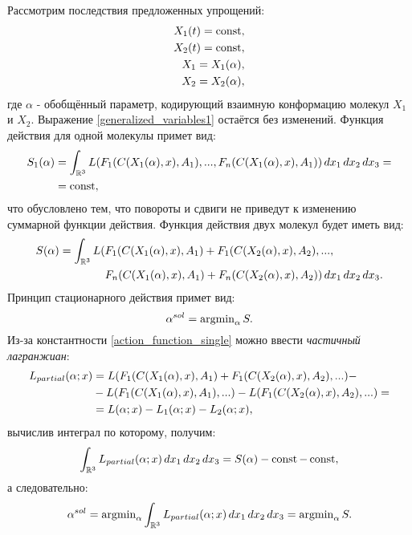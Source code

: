 Рассмотрим последствия предложенных упрощений:
\begin{align}
	X_1(t) = \operatorname{const}, \\
	X_2(t) = \operatorname{const}, \\
	X_1 = X_1(\alpha), \\
	X_2 = X_2(\alpha),
\end{align}
где $\alpha$ - обобщённый параметр, кодирующий взаимную конформацию молекул $X_1$ и $X_2$. Выражение \ref{generalized_variables1} остаётся без изменений.
Функция действия для одной молекулы примет вид:
\begin{align}
	S_1(\alpha) &= \int_{\mathbb{R}^3}L(F_1(C(X_1(\alpha), x), A_1), ...,F_n(C(X_1(\alpha), x), A_1)) \, dx_1 \, dx_2 \, dx_3 = \notag \\
				 &= \operatorname{const},
	\label{action_function_single}
\end{align}
что обусловлено тем, что повороты и сдвиги не приведут к изменению суммарной функции действия. Функция действия двух молекул будет иметь вид:
\begin{align}
	S(\alpha) = \int_{\mathbb{R}^3}L(&F_1(C(X_1(\alpha), x), A_1)+F_1(C(X_2(\alpha), x), A_2), ..., \notag \\
                                                     &F_n(C(X_1(\alpha), x), A_1) + F_n(C(X_2(\alpha), x), A_2)) \, dx_1 \, dx_2 \, dx_3.
	\label{action_function_two}
\end{align}
Принцип стационарного действия примет вид:
\begin{equation}
	\alpha^{sol} = \operatorname{argmin}_{\alpha}S.
	\label{lagrangian_principle_practical}
\end{equation}
Из-за константности \ref{action_function_single} можно ввести \textit{частичный лагранжиан}:
\begin{align}
	L_{partial}(\alpha; x) &= L(F_1(C(X_1(\alpha), x), A_1)+F_1(C(X_2(\alpha), x), A_2), ...) - \notag \\
						   &- L(F_1(C(X_1(\alpha), x), A_1), ...) - L(F_1(C(X_2(\alpha), x), A_2), ...) = \notag \\
						   &= L(\alpha; x) - L_1(\alpha; x) - L_2(\alpha; x),
	\label{partial_lagrangian}
\end{align}
вычислив интеграл по которому, получим:
\begin{equation}
	\int_{\mathbb{R}^3}L_{partial}(\alpha; x) \, dx_1 \, dx_2 \, dx_3 = S(\alpha) - \operatorname{const} - \operatorname{const},
\end{equation}
а следовательно:
\begin{equation}
	\alpha^{sol} = \operatorname{argmin}_{\alpha}\int_{\mathbb{R}^3}L_{partial}(\alpha; x) \, dx_1 \, dx_2 \, dx_3 = \operatorname{argmin}_{\alpha}S.
	\label{lagrangian_principle_practical_partial}
\end{equation}

